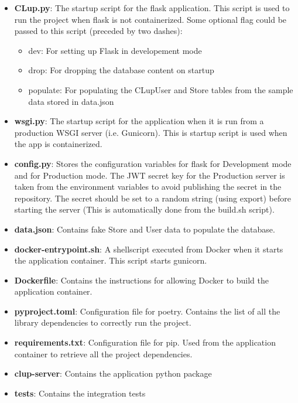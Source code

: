 \begin{itemize}
    \item \textbf{CLup.py}: The startup script for the flask application. This script is used to run the project when flask is not containerized. Some optional flag could be passed to this script (preceded by two dashes):
    \begin{itemize}
        \item dev:  For setting up Flask in developement mode 
        \item drop: For dropping the database content on startup
        \item populate: For populating the CLupUser and Store tables from the sample data stored in data.json
    \end{itemize}
    \item \textbf{wsgi.py}: The startup script for the application when it is run from a production WSGI server (i.e. Gunicorn). This is startup script is used when the app is containerized.
    \item \textbf{config.py}: Stores the configuration variables for flask for Development mode and for Production mode. The JWT secret key for the Production server is taken from the environment variables to avoid publishing the secret in the repository. The secret should be set to a random string (using export) before starting the server (This is automatically done from the build.sh script).
    \item \textbf{data.json}: Contains fake Store and User data to populate the database.
    \item \textbf{docker-entrypoint.sh}: A shellscript executed from Docker when it starts the application container. This script starts gunicorn.
    \item \textbf{Dockerfile}: Contains the instructions for allowing Docker to build the application container.
    \item \textbf{pyproject.toml}: Configuration file for poetry. Contains the list of all the library dependencies to correctly run the project.
    \item \textbf{requirements.txt}: Configuration file for pip. Used from the application container to retrieve all the project dependencies.
    \item \textbf{clup-server}: Contains the application python package
    \item \textbf{tests}: Contains the integration tests
\end{itemize}

